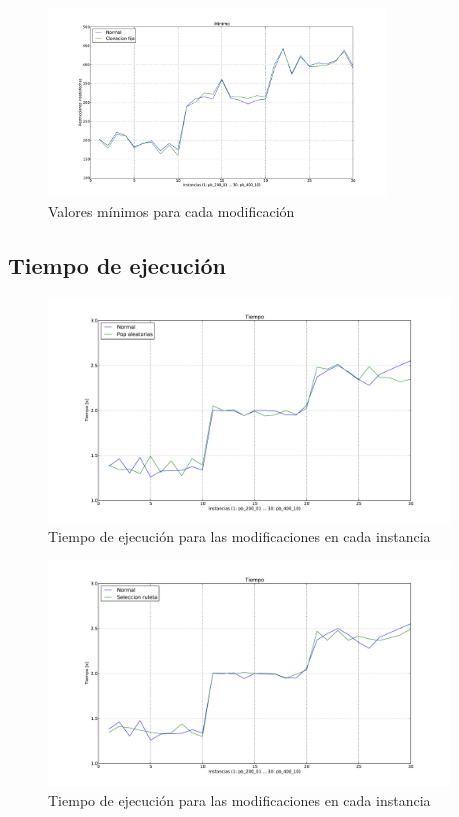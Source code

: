 \begin{figure}[H]
\begin{center}
\includegraphics[width=0.8\textwidth]{img/min-4.pdf}
\end{center}
\caption{Valores mínimos para cada modificación}
\label{fig:min-4}
\end{figure}


\newpage
\subsection{Tiempo de ejecución}

\begin{figure}[H]
\begin{center}
\includegraphics[width=0.95\textwidth]{img/t-1.pdf}
\end{center}
\caption{Tiempo de ejecución para las modificaciones en cada instancia}
\label{fig:t-1}
\end{figure}

\begin{figure}[H]
\begin{center}
\includegraphics[width=0.95\textwidth]{img/t-2.pdf}
\end{center}
\caption{Tiempo de ejecución para las modificaciones en cada instancia}
\label{fig:t-2}
\end{figure}

